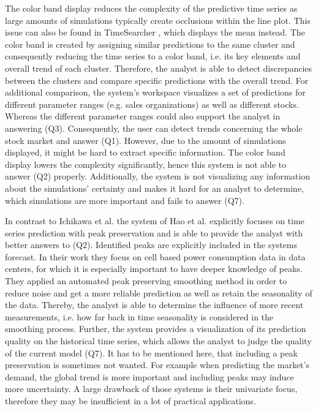 \documentclass[electronic]{vgtc}             %
\begin{document}
The color band display reduces the complexity of the predictive time series as large amounts of simulations typically create occlusions within the line plot.
This issue can also be found in TimeSearcher \cite{buono:2007}, which displays the mean instead.
The color band is created by assigning similar predictions to the same cluster and consequently reducing the time series to a color band, i.e. its key elements and overall trend of each cluster.
Therefore, the analyst is able to detect discrepancies between the clusters and compare specific predictions with the overall trend. 
For additional comparison, the system's workspace visualizes a set of predictions for different parameter ranges (e.g. sales organizations) as well as different stocks.
Whereas the different parameter ranges could also support the analyst in answering (Q3).
Consequently, the user can detect trends concerning the whole stock market and answer (Q1).  
However, due to the amount of simulations displayed, it might be hard to extract specific information.
The color band display lowers the complexity significantly, hence this system is not able to answer (Q2) properly.
Additionally, the system is not visualizing any information about the simulations' certainty and makes it hard for an analyst to determine, which simulations are more important and fails to answer (Q7).

In contrast to Ichikawa et al.\cite{ichikawa:2002} the system of Hao et al. \cite{Hao:2011, Hao:2009} explicitly focuses on time series prediction with peak preservation and is able to provide the analyst with better answers to (Q2).
Identified peaks are explicitly included in the systems forecast.
In their work they focus on cell based power consumption data in data centers, for which it is especially important to have deeper knowledge of peaks.
They applied an automated peak preserving smoothing method in order to reduce noise and get a more reliable prediction as well as retain the seasonality of the data.
Thereby, the analyst is able to determine the influence of more recent measurements, i.e. how far back in time seasonality is considered in the smoothing process. 
Further, the system provides a visualization of its prediction quality on the historical time series, which allows the analyst to judge the quality of the current model (Q7). 
It has to be mentioned here, that including a peak preservation is sometimes not wanted.
For example when predicting the market's demand, the global trend is more important and including peaks may induce more uncertainty. 
A large drawback of those systems is their univariate focus, therefore they may be insufficient in a lot of practical applications.
\end{document}
